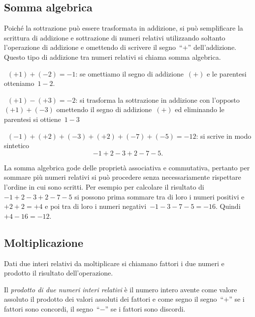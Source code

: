 \subsection{Somma algebrica}

Poiché la sottrazione può essere trasformata in addizione, si può 
semplificare 
la scrittura di addizione
e sottrazione di numeri relativi utilizzando soltanto l'operazione di 
addizione 
e omettendo di scrivere
il segno~``\(+\)'' dell'addizione. Questo tipo di addizione tra numeri 
relativi si 
chiama somma algebrica.

 \begin{esempio}{}{}
~\((+1)+(-2)=-1\): se omettiamo il segno di addizione~\((+)\) e le 
parentesi 
otteniamo~\(1-2\).
 \end{esempio}

\begin{esempio}{}{}
~\((+1)-(+3)=-2\): si trasforma la sottrazione in addizione con 
l'opposto~\((+1)+(-3)\) omettendo il segno
di addizione~\((+)\) ed eliminando le parentesi si ottiene~\(1-3\)
 \end{esempio}

\begin{esempio}{}{}
~\((-1)+(+2)+(-3)+(+2)+(-7)+(-5)=-12\): si scrive in modo sintetico 
\[-1+2-3+2-7-5.\]
 \end{esempio}


La somma algebrica gode delle proprietà associativa e commutativa, pertanto 
per 
sommare più numeri relativi
si può procedere senza necessariamente rispettare l'ordine in cui sono 
scritti. 
Per esempio per calcolare
il risultato di~\(-1+2-3+2-7-5\) si possono prima sommare tra di loro i 
numeri 
positivi e~\(+2+2=+4\)
e poi tra di loro i numeri negativi~\(-1-3-7-5=-16\). Quindi~\(+4-16=-12\).


\subsection{Moltiplicazione}

Dati due interi relativi da moltiplicare si chiamano fattori i due numeri e 
prodotto il
risultato dell'operazione.

Il \emph{prodotto di due numeri interi relativi} è il numero intero avente 
come 
valore assoluto il prodotto
dei valori assoluti dei fattori e come segno il segno~``\(+\)'' se i 
fattori sono 
concordi,
il segno~``\(-\)'' se i fattori sono discordi.

